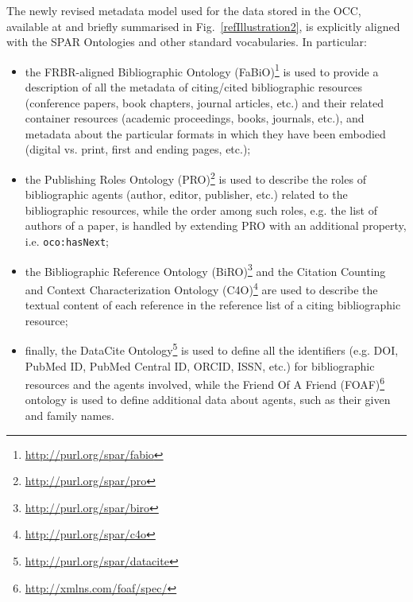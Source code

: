 \documentclass[runningheads,a4paper]{llncs}
\begin{document}
The newly revised metadata model used for the data stored in the OCC, available at  \cite{__RefNumPara__19_1852566440} and briefly summarised in Fig.~\ref{refIllustration2}, is explicitly aligned with the SPAR Ontologies  \cite{__RefNumPara__17_1852566440} and other standard vocabularies. In particular:
\begin{itemize}
\item the FRBR-aligned Bibliographic Ontology (FaBiO)\footnote{\url{http://purl.org/spar/fabio}} \cite{__RefNumPara__7775_1890349413} is used to provide a description of all the metadata of citing/cited bibliographic resources (conference papers, book chapters, journal articles, etc.) and their related container resources (academic proceedings, books, journals, etc.), and metadata about the particular formats in which they have been embodied (digital vs. print, first and ending pages, etc.);
\item the Publishing Roles Ontology (PRO)\footnote{\url{http://purl.org/spar/pro}} \cite{__RefNumPara__7993_1890349413} is used to describe the roles of bibliographic agents (author, editor, publisher, etc.) related to the bibliographic resources, while the order among such roles, e.g. the list of authors of a paper, is handled by extending PRO with an additional property, i.e. \Verb+oco:hasNext+;
\item the Bibliographic Reference Ontology (BiRO)\footnote{\url{http://purl.org/spar/biro}} and the Citation Counting and Context Characterization Ontology (C4O)\footnote{\url{http://purl.org/spar/c4o}} \cite{__RefNumPara__8388_1890349413} are used to describe the textual content of each reference in the reference list of a citing bibliographic resource;
\item finally, the DataCite Ontology\footnote{\url{http://purl.org/spar/datacite}} is used to define all the identifiers (e.g. DOI, PubMed ID, PubMed Central ID, ORCID, ISSN, etc.) for bibliographic resources and the agents involved, while the Friend Of A Friend (FOAF)\footnote{\url{http://xmlns.com/foaf/spec/}} ontology is used to define additional data about agents, such as their given and family names.
\end{itemize}
\end{document}
